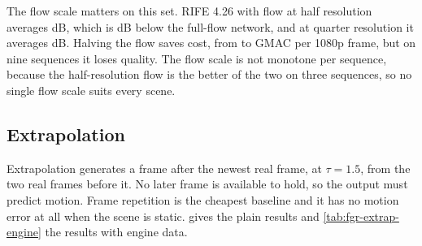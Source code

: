 \Observation{} The flow scale matters on this set. RIFE 4.26 with flow at half resolution averages  dB, which is  dB below the full-flow network, and at quarter resolution it averages  dB. Halving the flow saves cost, from  to  GMAC per 1080p frame, but on nine sequences it loses quality. The flow scale is not monotone per sequence, because the half-resolution flow is the better of the two on three sequences, so no single flow scale suits every scene.

\subsection{Extrapolation}\label{sec:fgr-extrap}

Extrapolation generates a frame after the newest real frame, at $\tau=1.5$, from the two real frames before it. No later frame is available to hold, so the output must predict motion. Frame repetition is the cheapest baseline and it has no motion error at all when the scene is static.  gives the plain results and \cref{tab:fgr-extrap-engine} the results with engine data.

